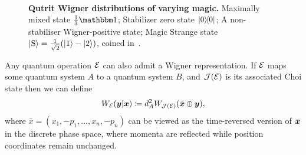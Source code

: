 \documentclass[pra,
aps,
twocolumn,
superscriptaddress,
groupedaddress,
nofootinbib,
reprint
]{revtex4-1}
\begin{document}
\begin{figure}[t]
    \centering
    \hspace{8pt}%
    \\
    \hspace{8pt}%
    \caption{\textbf{Qutrit Wigner distributions of varying magic.} 
     Maximally mixed state $\frac{1}{3}\id$;  Stabilizer zero state $\ketbra{0}{0}$;  A non-stabiliser Wigner-positive state;  Magic Strange state $\ket{{\rm{S}}} = \frac{1}{\sqrt{2}}(\ket{1} - \ket{2})$, coined in~\cite{cit:veitch2}.
    }%
    \label{fig:wstate_examples}
\end{figure}

Any quantum operation $\mathcal{E}$ can also admit a Wigner representation. If $\mathcal{E}$ maps some quantum system $A$ to a quantum system $B$, and $\mathcal{J}(\mathcal{E})$ is its associated Choi state then we can define
\begin{equation}
W_{\mathcal{E}}(\boldsymbol{y} |\boldsymbol{x}) \coloneqq d_A^2 W_{\mathcal{J}(\mathcal{E})}(\bar{\boldsymbol{x}} \oplus \boldsymbol{y}),
\end{equation}
where $\bar{x} =(x_1, -p_1, \dots , x_n, -p_n)$ can be viewed as the time-reversed version of $\boldsymbol{x}$ in the discrete phase space, where momenta are reflected while position coordinates remain unchanged.
\end{document}
